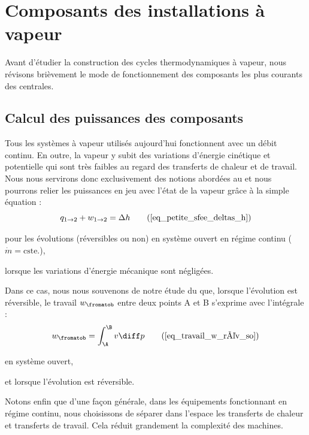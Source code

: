 \section{Composants des installations à vapeur}

	Avant d’étudier la construction des cycles thermodynamiques à vapeur, nous révisons brièvement le mode de fonctionnement des composants les plus courants des centrales.

	\subsection{Calcul des puissances des composants}
	\label{ch_expressions_puissances_vapeur}

		Tous les systèmes à vapeur utilisés aujourd’hui fonctionnent avec un débit continu. En outre, la vapeur y subit des variations d’énergie cinétique et potentielle qui sont très faibles au regard des transferts de chaleur et de travail. Nous nous servirons donc exclusivement des notions abordées au \courstrois et nous pourrons relier les puissances en jeu avec l’état de la vapeur grâce à la simple équation :
		\begin{equation}
				q_{1 \to 2} + w_{1 \to 2} = \Delta h 	\tag{\ref{eq_petite_sfee_deltas_h}}
		\end{equation}
		\begin{equationterms}
			\item pour les évolutions (réversibles ou non) en système ouvert en régime continu ($\dot m = \text{cste.}$),
			\item lorsque les variations d’énergie mécanique sont négligées.
		\end{equationterms}

		Dans ce cas, nous nous souvenons de notre étude du \courstroisshort que, lorsque l’évolution est réversible, le travail $w_\fromatob$ entre deux points A et B s’exprime avec l’intégrale :
		\begin{equation}
				w_\fromatob =  \int_\A^\B v \diff p 		\tag{\ref{eq_travail_w_rév_so}}
		\end{equation}
		\begin{equationterms}
			\item en système ouvert,
			\item et lorsque l’évolution est réversible.
		\end{equationterms}

		Notons enfin que d’une façon générale, dans les équipements fonctionnant en régime continu, nous choisissons de séparer dans l’espace les transferts de chaleur et transferts de travail. Cela réduit grandement la complexité des machines.

